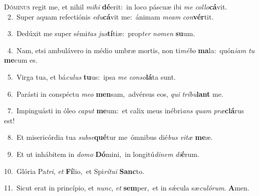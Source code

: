 \lettrine{\initial\textcolor{\initialcolor}{D}}{óminus} regit me, et nihil \textit{mi}\-\textit{hi} \textbf{dé}\-erit:~\star in loco páscuæ ibi \textit{me} \textit{col}\-\textit{lo}\textbf{cá}vit.\\
{\numbfont\textcolor{\numbcolor}{~2.}}~Super aquam refectiónis \textit{e}\-\textit{du}\textbf{cá}vit me:~\star ánimam \textit{me}\-\textit{am} \textit{con}\-\textbf{vér}tit.\par
{\numbfont\textcolor{\numbcolor}{~3.}}~Dedúxit me super sémi\textit{tas} \textit{jus}\-\textbf{tí}tiæ:~\star prop\textit{ter} \textit{no}\-\textit{men} \textbf{su}\-um.\par
{\numbfont\textcolor{\numbcolor}{~4.}}~Nam, etsi ambulávero in médio umbræ mortis, non ti\-\textit{mé}\-\textit{bo} \textbf{ma}\-la:~\star quón\-\textit{i}\-\textit{am} \textit{tu} \textbf{me}\-cum es.\par
{\numbfont\textcolor{\numbcolor}{~5.}}~Virga tua, et bá\-\textit{cu}\-\textit{lus} \textbf{tu}\-us:~\star ipsa \textit{me} \textit{con}\-\textit{so}\textbf{lá}ta sunt.\par
{\numbfont\textcolor{\numbcolor}{~6.}}~Parásti in conspéctu \textit{me}\-\textit{o} \textbf{men}\-sam,~\star advérsus eos, \textit{qui} \textit{trí}\-\textit{bu}\textbf{lant} me.\par
{\numbfont\textcolor{\numbcolor}{~7.}}~Impinguásti in óleo \textit{ca}\-\textit{put} \textbf{me}\-um:~\star et calix meus inébri\textit{ans} \textit{quam} \textit{præ}\-\textbf{clá}rus est!\par
{\numbfont\textcolor{\numbcolor}{~8.}}~Et misericórdia tua \textit{sub}\-\textit{se}\textbf{qué}tur me~\star ómnibus dié\textit{bus} \textit{vi}\-\textit{tæ} \textbf{me}\-æ.\par
{\numbfont\textcolor{\numbcolor}{~9.}}~Et ut inhábitem in \textit{do}\-\textit{mo} \textbf{Dó}\-mini,~\star in longitú\-\textit{di}\-\textit{nem} \textit{di}\-\textbf{é}rum.\par
{\numbfont\textcolor{\numbcolor}{10.}}~Glória Pa\-\textit{tri}\-, \textit{et} \textbf{Fí}\-lio,~\star et Spi\-\textit{rí}\-\textit{tu}\textit{i} \textbf{Sanc}\-to.\par
{\numbfont\textcolor{\numbcolor}{11.}}~Sicut erat in princípio, et \textit{nunc}\-, \textit{et} \textbf{sem}\-per,~\star et in sǽcula sæ\-\textit{cu}\-\textit{ló}\textit{rum}. \textbf{A}\-men.\par
